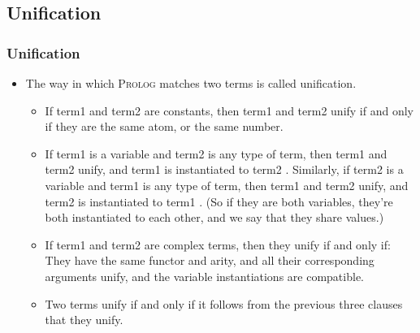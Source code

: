\documentclass[hideothersubsections, t, aspectratio=1610]{beamer}
\newcommand{\progLang}[1]{\textsc{#1}}
\begin{document}
\subsection{Unification}
\begin{frame}[fragile]
\frametitle{Unification}
\begin{itemize}
\item The way in which \progLang{Prolog} matches two terms is called unification. 
\begin{itemize}
\item If term1 and term2 are constants, then term1 and term2 unify if and only if they are the same atom, or the same number.
\item If term1 is a variable and term2 is any type of term, then term1 and term2 unify, and term1 is instantiated to term2 . Similarly, if term2 is a variable and term1 is any type of term, then term1 and term2 unify, and term2 is instantiated to term1 . (So if they are both variables, they’re both instantiated to each other, and we say that they share values.)

\item If term1 and term2 are complex terms, then they unify if and only if:
They have the same functor and arity, and
all their corresponding arguments unify, and
the variable instantiations are compatible.

\item Two terms unify if and only if it follows from the previous three clauses that they unify.
\end{itemize}
\end{itemize}
\end{frame}
\end{document}
